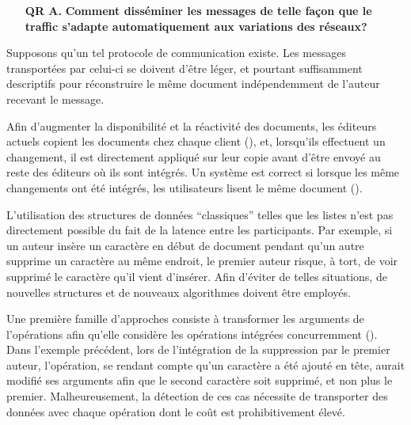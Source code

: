 \begin{itemize}
  \begin{itemize}
  \item [\textbf{QR A.}] \textbf{Comment disséminer les messages de telle façon
      que le traffic s'adapte automatiquement aux variations des réseaux?}
  \end{itemize}

  Supposons qu'un tel protocole de communication existe. Les messages
  transportées par celui-ci se doivent d'être léger, et pourtant suffisamment
  descriptifs pour réconstruire le même document indépendemment de l'auteur
  recevant le message.

  Afin d'augmenter la disponibilité et la réactivité des documents, les éditeurs
  actuels copient les documents chez chaque client (\REF), et, lorsqu'ils
  effectuent un changement, il est directement appliqué sur leur copie avant
  d'être envoyé au reste des éditeurs où ils sont intégrés. Un système est
  correct si lorsque les même changements ont été intégrés, les utilisateurs
  lisent le même document (\REF).

  L'utilisation des structures de données ``classiques'' telles que les listes
  n'est pas directement possible du fait de la latence entre les
  participants. Par exemple, si un auteur insère un caractère en début de
  document pendant qu'un autre supprime un caractère au même endroit, le premier
  auteur risque, à tort, de voir supprimé le caractère qu'il vient
  d'insérer. Afin d'éviter de telles situations, de nouvelles structures et de
  nouveaux algorithmes doivent être employés.

  Une première famille d'approches consiste à transformer les arguments de l'opérations
  afin qu'elle considère les opérations intégrées concurremment (\REF). Dans
  l'exemple précédent, lors de l'intégration de la suppression par le premier
  auteur, l'opération, se rendant compte qu'un caractère a été ajouté en tête,
  aurait modifié ses arguments afin que le second caractère soit supprimé, et
  non plus le premier. Malheureusement, la détection de ces cas nécessite de
  transporter des données avec chaque opération dont le coût est prohibitivement
  élevé. 


\end{itemize}
